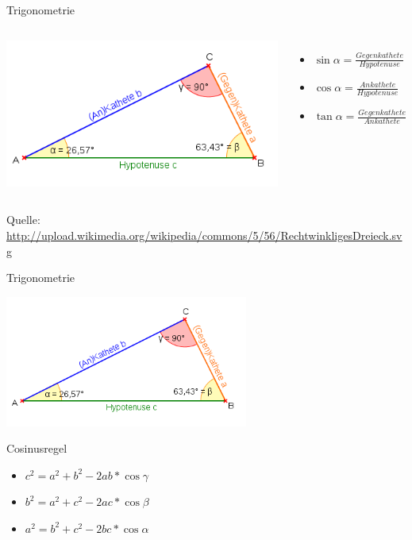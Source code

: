 \begin{frame}{Trigonometrie}
	\begin{columns}
	\includegraphics[width=1.1\textwidth,height=.8\textheight,keepaspectratio]{dreieck.png}
	\begin{itemize}
		\item $\sin \alpha = \frac{Gegenkathete}{Hypotenuse}$
		\item $\cos \alpha = \frac{Ankathete}{Hypotenuse}$
		\item $\tan \alpha = \frac{Gegenkathete}{Ankathete}$
	\end{itemize}
	\end{columns}
	Quelle: \url{http://upload.wikimedia.org/wikipedia/commons/5/56/RechtwinkligesDreieck.svg}
\end{frame}

\begin{frame}{Trigonometrie}
	\begin{center}
		\includegraphics[width=0.6\textwidth,height=.8\textheight,keepaspectratio]{dreieck.png}
	\end{center}
	
	\begin{block}{Cosinusregel}
		\begin{itemize}
			\item $c^2 = a^2 + b^2 - 2ab * \cos \gamma$
			\item $b^2 = a^2 + c^2 - 2ac * \cos \beta$
			\item $a^2 = b^2 + c^2 - 2bc * \cos \alpha$
		\end{itemize}
	\end{block}
\end{frame}

